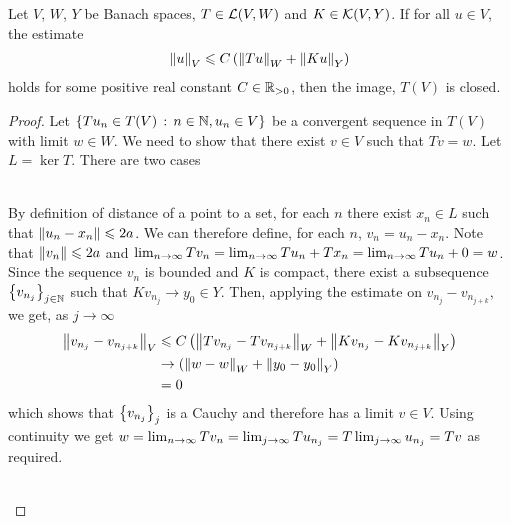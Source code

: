 \documentclass[12pt]{article}
\begin{document}
\begin{ftheorem} 
    Let $V$, $W$, $Y$ be Banach spaces, $T \in \L(V, W)$ and $K \in \K(V, Y)$. If for all $u \in V$, the estimate 
    \begin{align*}
    \norm[u]_V \leq C \brac{\norm[Tu]_W + \norm[Ku]_Y}
    \end{align*}
    holds for some positive real constant $C \in \R_{> 0}$, then the image, $T(V)$ is closed. 
\end{ftheorem}
\begin{proof}
    Let $\set{Tu_n \in T(V) \wh n \in \N, u_n \in V}$ be a convergent sequence in $T(V)$ with limit $w \in W$. We need to show that there exist $v \in V$ such that $T v = w$. Let $L = \ker T$. There are two cases 
    
    \begin{case} \hfill \\
        By definition of distance of a point to a set, for each $n$ there exist $x_n \in L$ such that $\norm[u_n - x_n] \leq 2a$. We can therefore define, for each $n$, $v_n = u_n - x_n$. Note that $\norm[v_n] \leq 2a$ and $\Lim Tv_n = \Lim T u_n + Tx_n = \Lim Tu_n + 0 = w$. Since the sequence $v_n$ is bounded and $K$ is compact, there exist a subsequence $\set{v_{n_j}}_{j \in \N}$ such that $Kv_{n_j} \to y_0 \in Y$. Then, applying the estimate on $v_{n_j} - v_{n_{j + k}}$, we get, as $j \to \infty$
        \begin{align*}
        \norm[v_{n_j} - v_{n_{j + k}}]_V 
        & \leq C \brac{\norm[Tv_{n_j} - Tv_{n_{j + k}}]_W + \norm[Kv_{n_j} - Kv_{n_{j + k}}]_Y} \\
        & \to  \brac{\norm[w - w]_W + \norm[y_0 - y_0]_Y} \\
        & = 0 
        \end{align*}
        which shows that $\set{v_{n_j}}_j$ is a Cauchy and therefore has a limit $v \in V$. Using continuity we get $w = \Lim Tv_{n} = \Lim[j] Tu_{n_j} = T \Lim[j] u_{n_j} = Tv$ as required. 
    \end{case} \hfill \\
    

\end{proof}
\end{document}
